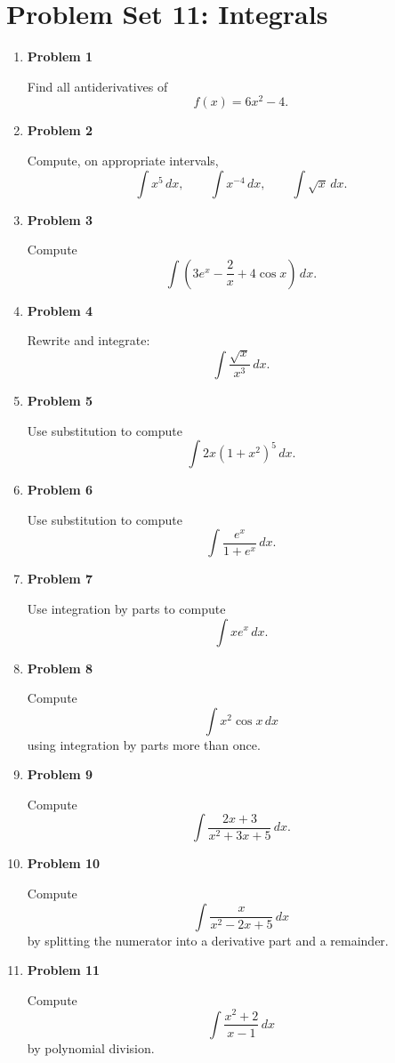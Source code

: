 \section{Problem Set 11: Integrals}

\begin{enumerate}
\item \textbf{Problem 1}\par
Find all antiderivatives of
\[
f(x)=6x^2-4.
\]

\item \textbf{Problem 2}\par
Compute, on appropriate intervals,
\[
\int x^5\,dx,
\qquad
\int x^{-4}\,dx,
\qquad
\int \sqrt{x}\,dx.
\]

\item \textbf{Problem 3}\par
Compute
\[
\int \left(3e^x-\frac{2}{x}+4\cos x\right)\,dx.
\]

\item \textbf{Problem 4}\par
Rewrite and integrate:
\[
\int \frac{\sqrt{x}}{x^3}\,dx.
\]

\item \textbf{Problem 5}\par
Use substitution to compute
\[
\int 2x(1+x^2)^5\,dx.
\]

\item \textbf{Problem 6}\par
Use substitution to compute
\[
\int \frac{e^x}{1+e^x}\,dx.
\]

\item \textbf{Problem 7}\par
Use integration by parts to compute
\[
\int xe^x\,dx.
\]

\item \textbf{Problem 8}\par
Compute
\[
\int x^2\cos x\,dx
\]
using integration by parts more than once.

\item \textbf{Problem 9}\par
Compute
\[
\int \frac{2x+3}{x^2+3x+5}\,dx.
\]

\item \textbf{Problem 10}\par
Compute
\[
\int \frac{x}{x^2-2x+5}\,dx
\]
by splitting the numerator into a derivative part and a remainder.

\item \textbf{Problem 11}\par
Compute
\[
\int \frac{x^2+2}{x-1}\,dx
\]
by polynomial division.


\end{enumerate}

